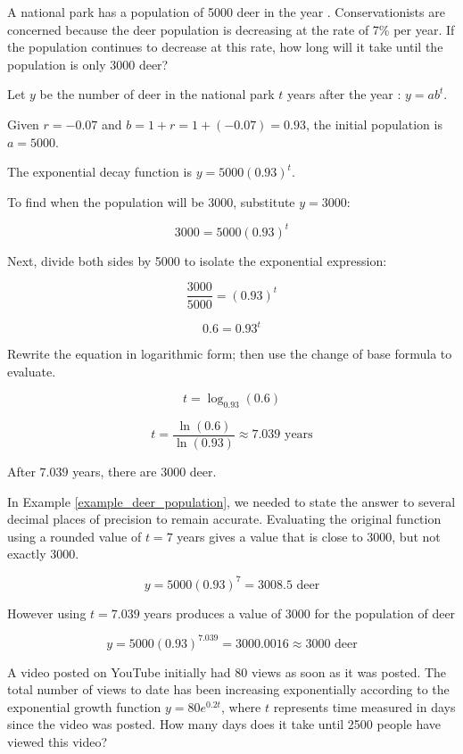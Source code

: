 \begin{example} \label{example_deer_population}
    A national park has a population of 5000 deer in the year \the\year. Conservationists are concerned because the deer population is decreasing at the rate of 7\% per year. If the population continues to decrease at this rate, how long will it take until the population is only 3000 deer?
\end{example}
\begin{solution}

    Let \( y \) be the number of deer in the national park \( t \) years after the year \the\year: \( y = ab^t \).

    Given \( r = -0.07 \) and \( b = 1 + r = 1 + (-0.07) = 0.93 \), the initial population is \( a = 5000 \).

    The exponential decay function is \( y = 5000(0.93)^t \).

    To find when the population will be 3000, substitute \( y = 3000 \):

    \[ 3000 = 5000(0.93)^t \]

    Next, divide both sides by 5000 to isolate the exponential expression:

    \[ \frac{3000}{5000} = (0.93)^t \]

    \[ 0.6 = 0.93^t \]

    Rewrite the equation in logarithmic form; then use the change of base formula to evaluate.

    \[ t = \log_{0.93}(0.6) \]

    \[ t = \frac{\ln(0.6)}{\ln(0.93)} \approx 7.039 \text{ years} \]

    After \( 7.039 \) years, there are 3000 deer.
\end{solution}

In Example \ref{example_deer_population}, we needed to state the answer to several decimal places of precision to remain accurate. Evaluating the original function using a rounded value of \( t = 7 \) years gives a value that is close to 3000, but not exactly 3000.

\[ y = 5000(0.93)^7 = 3008.5 \text{ deer} \]

However using \( t = 7.039 \) years produces a value of 3000 for the population of deer

\[ y = 5000(0.93)^{7.039} = 3000.0016 \approx 3000 \text{ deer} \]

\begin{example}
    A video posted on YouTube initially had 80 views as soon as it was posted. The total number of views to date has been increasing exponentially according to the exponential growth function \( y = 80e^{0.2t} \), where \( t \) represents time measured in days since the video was posted. How many days does it take until 2500 people have viewed this video?
\end{example}

